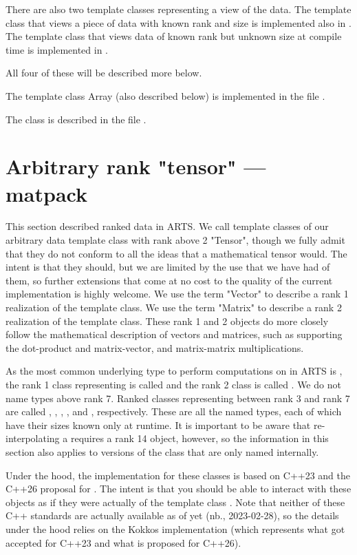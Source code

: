 There are also two template classes representing a view of the data.  The template class that
views a piece of data with known rank and size is implemented also in .
The template class that views data of known rank but unknown size at compile time is implemented
in .

All four of these will be described more below.

The template class Array (also described below) is implemented in the file .

The  class is described in the file .

\section{Arbitrary rank "tensor" --- matpack}
This section described ranked data in ARTS.  We call template classes of our arbitrary data
template class with rank above 2 "Tensor", though we fully admit that they do not conform to all the ideas
that a mathematical tensor would.  The intent is that they should, but we are limited by the
use that we have had of them, so further extensions that come at no cost to the quality of
the current implementation is highly welcome.  We use the term "Vector" to describe
a rank 1 realization of the template class.  We use the term "Matrix" to 
describe a rank 2 realization of the template class.  These rank 1 and 2 objects do more closely
follow the mathematical description of vectors and matrices, such as supporting the dot-product and
matrix-vector, and matrix-matrix multiplications.

As the most common underlying type
to perform computations on in ARTS is , the rank 1 class representing
 is called  and the rank 2 class is called .
We do not name types above rank 7.  Ranked classes representing  between rank 3
and rank 7 are called , , , ,
and , respectively.  These are all the named types, each of which have their
sizes known only at runtime.  It is important to be aware that re-interpolating a 
requires a rank 14 object, however, so the information in this section also applies to versions of 
the class that are only named internally.

Under the hood, the implementation for these classes is based on C++23 
and the C++26 proposal for .  The intent is that you should be able to
interact with these objects as if they were actually of the template class .
Note that neither of these C++ standards are actually available as of yet (nb., 2023-02-28), so the
details under the hood relies on the Kokkos implementation (which represents what got accepted for C++23
and what is proposed for C++26). 

